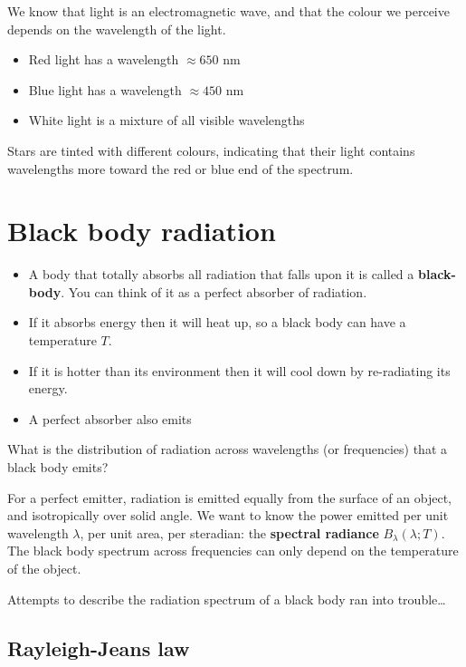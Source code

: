 \documentclass[
  letterpaper,
  DIV=11,
  numbers=noendperiod]{scrreprt}
\providecommand{\tightlist}{%
  \setlength{\itemsep}{0pt}\setlength{\parskip}{0pt}}\usepackage{longtable,booktabs,array}
\begin{document}
We know that light is an electromagnetic wave, and that the colour we
perceive depends on the wavelength of the light.

\begin{itemize}
\tightlist
\item
  Red light has a wavelength \(\approx 650\) nm
\item
  Blue light has a wavelength \(\approx 450\) nm
\item
  White light is a mixture of all visible wavelengths
\end{itemize}

Stars are tinted with different colours, indicating that their light
contains wavelengths more toward the red or blue end of the spectrum.

\hypertarget{black-body-radiation}{%
\section{Black body radiation}\label{black-body-radiation}}

\begin{itemize}
\tightlist
\item
  A body that totally absorbs all radiation that falls upon it is called
  a \textbf{black-body}. You can think of it as a perfect absorber of
  radiation.
\item
  If it absorbs energy then it will heat up, so a black body can have a
  temperature \(T\).
\item
  If it is hotter than its environment then it will cool down by
  re-radiating its energy.
\item
  A perfect absorber also emits
\end{itemize}

What is the distribution of radiation across wavelengths (or
frequencies) that a black body emits?

For a perfect emitter, radiation is emitted equally from the surface of
an object, and isotropically over solid angle. We want to know the power
emitted per unit wavelength \(\lambda\), per unit area, per steradian:
the \textbf{spectral radiance} \(B_\lambda(\lambda;T)\). The black body
spectrum across frequencies can only depend on the temperature of the
object.

Attempts to describe the radiation spectrum of a black body ran into
trouble\ldots{}

\hypertarget{rayleigh-jeans-law}{%
\subsection{Rayleigh-Jeans law}\label{rayleigh-jeans-law}}
\end{document}
